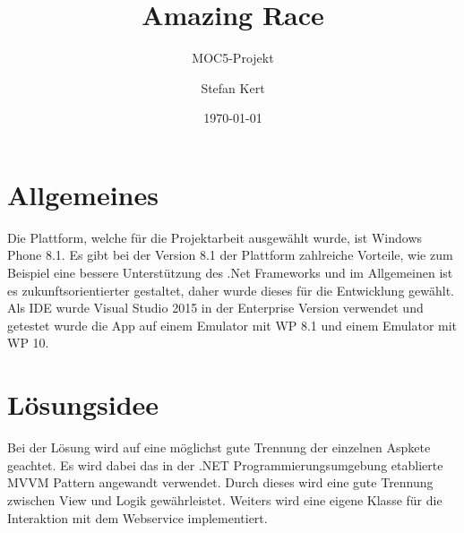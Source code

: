 \documentclass[a4paper,ngerman]{scrartcl}
\begin{document}
\title{Amazing Race}
\subtitle{MOC5-Projekt}
\author{Stefan Kert}
\date{\today}
\maketitle

\section{Allgemeines}
Die Plattform, welche für die Projektarbeit ausgewählt wurde, ist Windows Phone 8.1. Es gibt bei der Version 8.1 der Plattform zahlreiche Vorteile, wie zum Beispiel eine bessere Unterstützung des .Net Frameworks und im Allgemeinen ist es zukunftsorientierter gestaltet, daher wurde dieses für die Entwicklung gewählt. Als IDE wurde Visual Studio 2015 in der Enterprise Version verwendet und getestet wurde die App auf einem Emulator mit WP 8.1 und einem Emulator mit WP 10. 

\section{Lösungsidee}
Bei der Lösung wird auf eine möglichst gute Trennung der einzelnen Aspkete geachtet. Es wird dabei das in der .NET Programmierungsumgebung etablierte MVVM Pattern angewandt verwendet. Durch dieses wird eine gute Trennung zwischen View und Logik gewährleistet. Weiters wird eine eigene Klasse für die Interaktion mit dem Webservice implementiert. 
\end{document}
